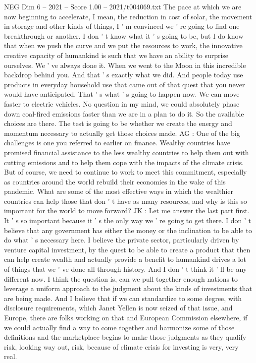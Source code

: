 \begin{textsample}{NEG Dim 6 – 2021 – Score 1.00 – 2021/t004069.txt}
The pace at which we are now beginning to accelerate, I mean, the reduction in cost of solar, the movement in storage and other kinds of things, I ' m convinced we ' re going to find one breakthrough or another.
I don ' t know what it ' s going to be, but I do know that when we push the curve and we put the resources to work, the innovative creative capacity of humankind is such that we have an ability to surprise ourselves.
We ' ve always done it.
When we went to the Moon in this incredible backdrop behind you.
And that ' s exactly what we did.
And people today use products in everyday household use that came out of that quest that you never would have anticipated.
That ' s what ' s going to happen now.
We can move faster to electric vehicles.
No question in my mind, we could absolutely phase down coal-fired emissions faster than we are in a plan to do it.
So the available choices are there.
The test is going to be whether we create the energy and momentum necessary to actually get those choices made.
AG : One of the big challenges is one you referred to earlier on finance.
Wealthy countries have promised financial assistance to the less wealthy countries to help them out with cutting emissions and to help them cope with the impacts of the climate crisis.
But of course, we need to continue to work to meet this commitment, especially as countries around the world rebuild their economies in the wake of this pandemic.
What are some of the most effective ways in which the wealthier countries can help those that don ' t have as many resources, and why is this so important for the world to move forward?
JK : Let me answer the last part first.
It ' s so important because it ' s the only way we ' re going to get there.
I don ' t believe that any government has either the money or the inclination to be able to do what ' s necessary here.
I believe the private sector, particularly driven by venture capital investment, by the quest to be able to create a product that then can help create wealth and actually provide a benefit to humankind drives a lot of things that we ' ve done all through history.
And I don ' t think it ' ll be any different now.
I think the question is, can we pull together enough nations to leverage a uniform approach to the judgment about the kinds of investments that are being made.
And I believe that if we can standardize to some degree, with disclosure requirements, which Janet Yellen is now seized of that issue, and Europe, there are folks working on that and European Commission elsewhere, if we could actually find a way to come together and harmonize some of those definitions and the marketplace begins to make those judgments as they qualify risk, looking way out, risk, because of climate crisis for investing is very, very real.

\end{textsample}
